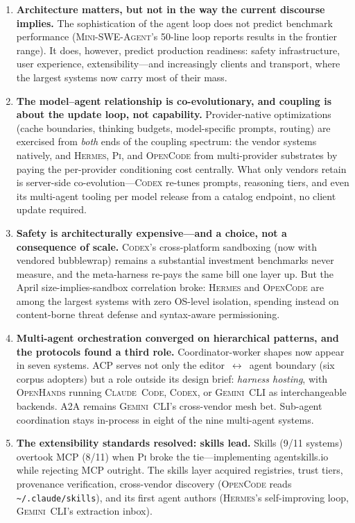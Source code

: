 \documentclass[11pt,a4paper]{article}
\newcommand{\clcode}{\textsc{Claude~Code}\xspace}
\newcommand{\cdx}{\textsc{Codex}\xspace}
\newcommand{\oh}{\textsc{OpenHands}\xspace}
\newcommand{\mswe}{\textsc{Mini-SWE-Agent}\xspace}
\newcommand{\gemini}{\textsc{Gemini~CLI}\xspace}
\newcommand{\hrm}{\textsc{Hermes}\xspace}
\newcommand{\pib}{\textsc{Pi}\xspace}
\newcommand{\ocd}{\textsc{OpenCode}\xspace}
\begin{document}
\begin{enumerate}[itemsep=2pt]
  \item \textbf{Architecture matters, but not in the way the current discourse implies.} The sophistication of the agent loop does not predict benchmark performance (\mswe{}'s 50-line loop reports results in the frontier range). It does, however, predict production readiness: safety infrastructure, user experience, extensibility---and increasingly clients and transport, where the largest systems now carry most of their mass.

  \item \textbf{The model--agent relationship is co-evolutionary, and coupling is about the update loop, not capability.} Provider-native optimizations (cache boundaries, thinking budgets, model-specific prompts, routing) are exercised from \emph{both} ends of the coupling spectrum: the vendor systems natively, and \hrm{}, \pib{}, and \ocd{} from multi-provider substrates by paying the per-provider conditioning cost centrally. What only vendors retain is server-side co-evolution---\cdx{} re-tunes prompts, reasoning tiers, and even its multi-agent tooling per model release from a catalog endpoint, no client update required.

  \item \textbf{Safety is architecturally expensive---and a choice, not a consequence of scale.} \cdx{}'s cross-platform sandboxing (now with vendored bubblewrap) remains a substantial investment benchmarks never measure, and the meta-harness re-pays the same bill one layer up. But the April size-implies-sandbox correlation broke: \hrm{} and \ocd{} are among the largest systems with zero OS-level isolation, spending instead on content-borne threat defense and syntax-aware permissioning.

  \item \textbf{Multi-agent orchestration converged on hierarchical patterns, and the protocols found a third role.} Coordinator-worker shapes now appear in seven systems. ACP serves not only the editor~$\leftrightarrow$~agent boundary (six corpus adopters) but a role outside its design brief: \emph{harness hosting}, with \oh{} running \clcode{}, \cdx{}, or \gemini{} as interchangeable backends. A2A remains \gemini{}'s cross-vendor mesh bet. Sub-agent coordination stays in-process in eight of the nine multi-agent systems.

  \item \textbf{The extensibility standards resolved: skills lead.} Skills (9/11 systems) overtook MCP (8/11) when \pib{} broke the tie---implementing agentskills.io while rejecting MCP outright. The skills layer acquired registries, trust tiers, provenance verification, cross-vendor discovery (\ocd{} reads \texttt{\textasciitilde/.claude/skills}), and its first agent authors (\hrm{}'s self-improving loop, \gemini{}'s extraction inbox).


\end{enumerate}
\end{document}
